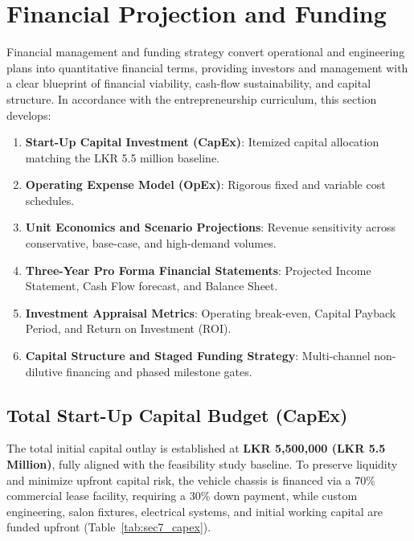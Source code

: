 
\section{Financial Projection and Funding}
\label{sec:financial_projections_funding}

Financial management and funding strategy convert operational and engineering plans into quantitative financial terms, providing investors and management with a clear blueprint of financial viability, cash-flow sustainability, and capital structure. In accordance with the entrepreneurship curriculum, this section develops:
\begin{enumerate}[label=(\alph*), itemsep=0.1em]
    \item \textbf{Start-Up Capital Investment (CapEx)}: Itemized capital allocation matching the LKR 5.5 million baseline.
    \item \textbf{Operating Expense Model (OpEx)}: Rigorous fixed and variable cost schedules.
    \item \textbf{Unit Economics and Scenario Projections}: Revenue sensitivity across conservative, base-case, and high-demand volumes.
    \item \textbf{Three-Year Pro Forma Financial Statements}: Projected Income Statement, Cash Flow forecast, and Balance Sheet.
    \item \textbf{Investment Appraisal Metrics}: Operating break-even, Capital Payback Period, and Return on Investment (ROI).
    \item \textbf{Capital Structure and Staged Funding Strategy}: Multi-channel non-dilutive financing and phased milestone gates.
\end{enumerate}

\subsection{Total Start-Up Capital Budget (CapEx)}
\label{subsec:startup_capex}

The total initial capital outlay is established at \textbf{LKR 5,500,000 (LKR 5.5 Million)}, fully aligned with the feasibility study baseline. To preserve liquidity and minimize upfront capital risk, the vehicle chassis is financed via a 70\% commercial lease facility, requiring a 30\% down payment, while custom engineering, salon fixtures, electrical systems, and initial working capital are funded upfront (Table~\ref{tab:sec7_capex}).

